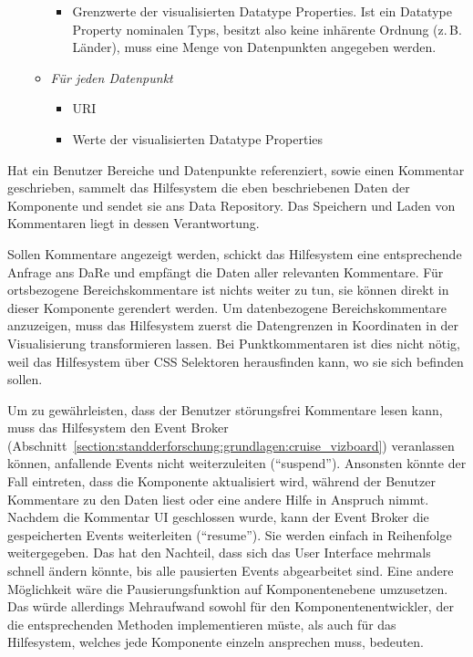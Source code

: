 \documentclass[
	headsepline,
	footsepline,
	fontsize=12pt,
	bibliography=totoc
]{scrbook}
\begin{document}
\begin{itemize}
\begin{itemize}
		\begin{itemize}
			\item Grenzwerte der visualisierten Datatype Properties. Ist ein Datatype Property nominalen Typs, besitzt also keine inhärente Ordnung (z.\,B. Länder), muss eine Menge von Datenpunkten angegeben werden.
		\end{itemize}
	\item \textit{Für jeden Datenpunkt}
		\begin{itemize}
			\item URI
			\item Werte der visualisierten Datatype Properties
		\end{itemize}
	\end{itemize}
\end{itemize}


Hat ein Benutzer Bereiche und Datenpunkte referenziert, sowie einen Kommentar geschrieben, sammelt das Hilfesystem die eben beschriebenen Daten der Komponente und sendet sie ans Data Repository. Das Speichern und Laden von Kommentaren liegt in dessen Verantwortung. 


Sollen Kommentare angezeigt werden, schickt das Hilfesystem eine entsprechende Anfrage ans DaRe und empfängt die Daten aller relevanten Kommentare. Für ortsbezogene Bereichskommentare ist nichts weiter zu tun, sie können direkt in dieser Komponente gerendert werden. Um datenbezogene Bereichskommentare anzuzeigen, muss das Hilfesystem zuerst die Datengrenzen in Koordinaten in der Visualisierung transformieren lassen. Bei Punktkommentaren ist dies nicht nötig, weil das Hilfesystem über CSS Selektoren herausfinden kann, wo sie sich befinden sollen.


Um zu gewährleisten, dass der Benutzer störungsfrei Kommentare lesen kann, muss das Hilfesystem den Event Broker (Abschnitt~\ref{section:standderforschung:grundlagen:cruise_vizboard}) veranlassen können, anfallende Events nicht weiterzuleiten (\enquote{suspend}). Ansonsten könnte der Fall eintreten, dass die Komponente aktualisiert wird, während der Benutzer Kommentare zu den Daten liest oder eine andere Hilfe in Anspruch nimmt. Nachdem die Kommentar UI geschlossen wurde, kann der Event Broker die gespeicherten Events weiterleiten (\enquote{resume}). Sie werden einfach in Reihenfolge weitergegeben. Das hat den Nachteil, dass sich das User Interface mehrmals schnell ändern könnte, bis alle pausierten Events abgearbeitet sind. Eine andere Möglichkeit wäre die Pausierungsfunktion auf Komponentenebene umzusetzen. Das würde allerdings Mehraufwand sowohl für den Komponentenentwickler, der die entsprechenden Methoden implementieren müste, als auch für das Hilfesystem, welches jede Komponente einzeln ansprechen muss, bedeuten.
\end{document}
